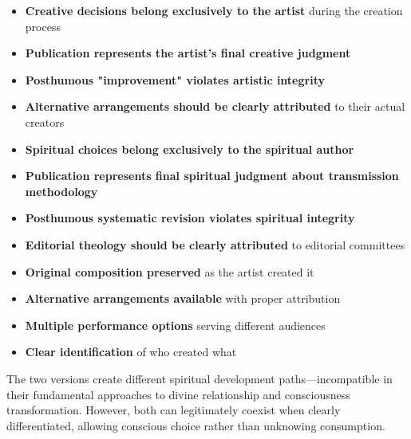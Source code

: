 \documentclass[12pt,twoside]{book}
\begin{document}
\begin{itemize}
\item \textbf{\textbf{Creative decisions belong exclusively to the artist}} during the creation process
\item \textbf{\textbf{Publication represents the artist's final creative judgment}}
\item \textbf{\textbf{Posthumous "improvement" violates artistic integrity}}
\item \textbf{\textbf{Alternative arrangements should be clearly attributed}} to their actual creators

\item \textbf{\textbf{Spiritual choices belong exclusively to the spiritual author}}
\item \textbf{\textbf{Publication represents final spiritual judgment about transmission methodology}}
\item \textbf{\textbf{Posthumous systematic revision violates spiritual integrity}}
\item \textbf{\textbf{Editorial theology should be clearly attributed}} to editorial committees

\item \textbf{\textbf{Original composition preserved}} as the artist created it
\item \textbf{\textbf{Alternative arrangements available}} with proper attribution
\item \textbf{\textbf{Multiple performance options}} serving different audiences
\item \textbf{\textbf{Clear identification}} of who created what
\end{itemize}

The two versions create different spiritual development paths—incompatible in their fundamental approaches to divine relationship and consciousness transformation. However, both can legitimately coexist when clearly differentiated, allowing conscious choice rather than unknowing consumption.
\end{document}
